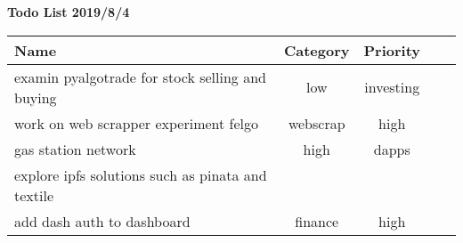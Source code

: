 \textbf{Todo List 2019/8/4}

\begin{tabular}{p{3cm} c c c c}Name & Category & Priority \\ \hline  examin pyalgotrade for stock selling and buying &  low &  investing \\ \hline  work on web scrapper experiment felgo &  webscrap &  high \\ \hline  gas station network  &  high &  dapps \\ \hline  explore ipfs solutions such as pinata and textile &   &  \\ \hline  add dash auth to dashboard &  finance &  high \\ \hline
\end{tabular}
